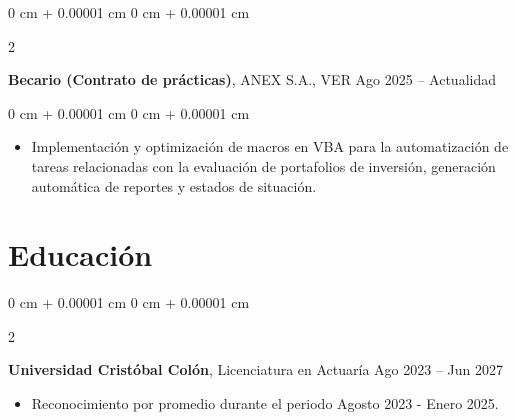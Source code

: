\documentclass[10pt, letterpaper]{article}
\newenvironment{highlights}{
    \begin{itemize}[
        topsep=0.10 cm,
        parsep=0.10 cm,
        partopsep=0pt,
        itemsep=0pt,
        leftmargin=0 cm + 10pt
    ]
}{
    \end{itemize}
} %
\newenvironment{onecolentry}{
    \begin{adjustwidth}{
        0 cm + 0.00001 cm
    }{
        0 cm + 0.00001 cm
    }
}{
    \end{adjustwidth}
} %
\newenvironment{twocolentry}[2][]{
    \onecolentry
    \def\secondColumn{#2}
    \setcolumnwidth{\fill, 4.5 cm}
    \begin{paracol}{2}
}{
    \switchcolumn \raggedleft \secondColumn
    \end{paracol}
    \endonecolentry
} %
\begin{document}
        \begin{twocolentry}{
           Ago 2025 – Actualidad
        }
            \textbf{Becario (Contrato de prácticas)}, ANEX S.A., VER \end{twocolentry}

        \vspace{0.10 cm}
        \begin{onecolentry}
            \begin{highlights}
                \item Implementación y optimización de macros en VBA para la automatización de tareas relacionadas con la evaluación de portafolios de inversión, generación automática de reportes y estados de situación. 
            \end{highlights}
        \end{onecolentry}

        


    
    \section{Educación}
        
        \begin{twocolentry}{
            Ago 2023 – Jun 2027
        }
            \textbf{Universidad Cristóbal Colón}, Licenciatura en Actuaría\end{twocolentry}
                \begin{highlights}
                    \item Reconocimiento por promedio durante el periodo Agosto 2023 - Enero 2025.
                \end{highlights}    
        \vspace{0.10 cm}
\end{document}
